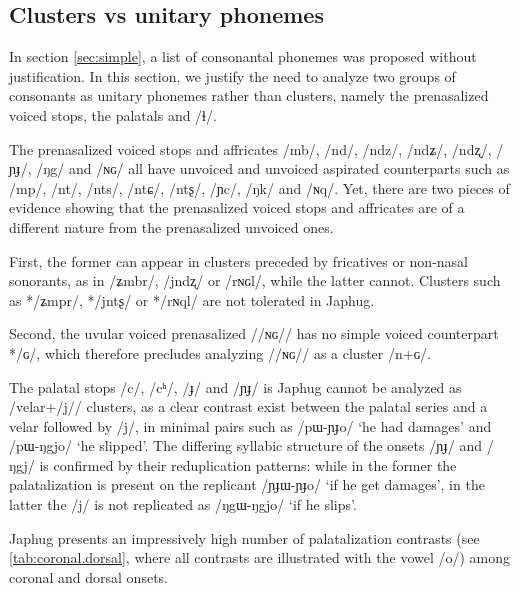 \documentclass[oldfontcommands,oneside,a4paper,11pt]{article}
\newcommand{\ipa}[1]{/#1/} %
\begin{document}
      \subsection{Clusters vs unitary phonemes} \label{sec:non.clusters}
      In section \ref{sec:simple}, a list of consonantal phonemes was proposed without justification. In this section, we justify the need to analyze two groups of consonants as unitary phonemes rather than clusters, namely the prenasalized voiced stops, the palatals and \ipa{ɬ}.
      
      
      The prenasalized voiced stops and affricates \ipa{mb}, \ipa{nd}, \ipa{ndz}, \ipa{ndʑ}, \ipa{ndʐ}, \ipa{ɲɟ}, \ipa{ŋg} and \ipa{ɴɢ} all have unvoiced and unvoiced aspirated counterparts such as \ipa{mp}, \ipa{nt}, \ipa{nts}, \ipa{ntɕ}, \ipa{ntʂ}, \ipa{ɲc}, \ipa{ŋk} and \ipa{ɴq}. Yet, there are two pieces of evidence showing that the prenasalized voiced stops and affricates are of a different nature from the prenasalized unvoiced ones. 
      
      First, the former can appear in clusters preceded by fricatives or non-nasal sonorants, as in \ipa{ʑmbr}, \ipa{jndʐ} or \ipa{rɴɢl}, while the latter cannot. Clusters such as *\ipa{ʑmpr}, *\ipa{jntʂ} or *\ipa{rɴql} are not tolerated in Japhug.
      
Second, the uvular voiced prenasalized /\ipa{ɴɢ}/ has no simple voiced counterpart *\ipa{ɢ}, which therefore precludes analyzing /\ipa{ɴɢ}/ as a cluster \ipa{n+ɢ}.
      


The palatal stops \ipa{c}, \ipa{cʰ}, \ipa{ɟ} and \ipa{ɲɟ} is Japhug cannot be analyzed as /velar+\ipa{j}/ clusters, as a clear contrast exist between the palatal series and a velar followed by \ipa{j}, in minimal pairs such as   \ipa{pɯ-ɲɟo} `he had damages' and \ipa{pɯ-ŋgjo} `he slipped'. The differing syllabic structure of the onsets \ipa{ɲɟ} and \ipa{ŋgj} is confirmed by their reduplication patterns: while in the former the palatalization is present on the replicant \ipa{ɲɟɯ-ɲɟo} `if he get damages', in the latter the \ipa{j} is not replicated as  \ipa{ŋgɯ-ŋgjo} `if he slips'.
      
      Japhug   presents an impressively high number of palatalization contrasts (see \ref{tab:coronal.dorsal}, where all contrasts are illustrated with the vowel \ipa{o}) among coronal and dorsal onsets. 
      
\end{document}
